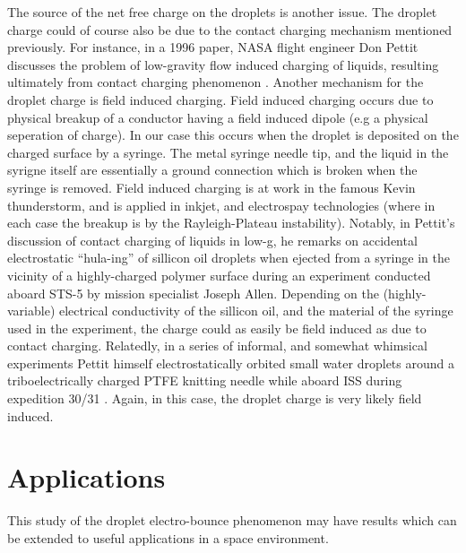 \documentclass[12pt,a4paper,oneside]{book}
\begin{document}
The source of the net free charge on the droplets is another issue. The droplet charge could of course also be due to the contact charging mechanism mentioned previously. For instance, in a 1996 paper, NASA flight engineer Don Pettit discusses the problem of low-gravity flow induced charging of liquids, resulting ultimately from contact charging phenomenon \cite{pettit_donald_flow_????}. Another mechanism for the droplet charge is field induced charging. Field induced charging occurs due to physical breakup of a conductor having a field induced dipole (e.g a physical seperation of charge). In our case this occurs when the droplet is deposited on the charged surface by a syringe. The metal syringe needle tip, and the liquid in the syrigne itself are essentially a ground connection which is broken when the syringe is removed. Field induced charging is at work in the famous Kevin thunderstorm, and is applied in inkjet, and electrospay technologies (where in each case the breakup is by the Rayleigh-Plateau instability). Notably, in Pettit's discussion of contact charging of liquids in low-g, he remarks on accidental electrostatic ``hula-ing'' of sillicon oil droplets when ejected from a syringe in the vicinity of a highly-charged polymer surface during an experiment conducted aboard STS-5 by mission specialist Joseph Allen. Depending on the (highly-variable) electrical conductivity of the sillicon oil, and the material of the syringe used in the experiment, the charge could as easily be field induced as due to contact charging. Relatedly, in a series of informal, and somewhat whimsical experiments Pettit himself electrostatically orbited small water droplets around a triboelectrically charged PTFE knitting needle while aboard ISS during expedition 30/31 \cite{stevenson_electrostatic_2015}. Again, in this case, the droplet charge is very likely field induced.  

\section{Applications}
This study of the droplet electro-bounce phenomenon may have results which can be extended to useful applications in a space environment.
\end{document}
